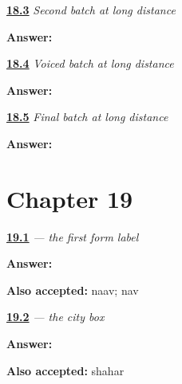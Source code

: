 \noindent\begin{minipage}[t]{\linewidth}
\raggedright
\hyperlink{review-MR-R18-script-b-r4-check}{\textbf{18.3}} \emph{Second batch at long distance}\par
\small \textbf{Answer:}   \par
\end{minipage}\par\medskip

\noindent\begin{minipage}[t]{\linewidth}
\raggedright
\hyperlink{review-MR-R18-script-c-r4-check}{\textbf{18.4}} \emph{Voiced batch at long distance}\par
\small \textbf{Answer:}   \par
\end{minipage}\par\medskip

\noindent\begin{minipage}[t]{\linewidth}
\raggedright
\hyperlink{review-MR-R18-script-d-r4-check}{\textbf{18.5}} \emph{Final batch at long distance}\par
\small \textbf{Answer:}   \par
\end{minipage}\par\medskip

\section*{Chapter 19}

\noindent\begin{minipage}[t]{\linewidth}
\raggedright
\hyperlink{review-MR-A1F01-naav-check}{\textbf{19.1}} \emph{ — the first form label}\par
\small \textbf{Answer:} \par
\footnotesize \textbf{Also accepted:} naav; nav
\end{minipage}\par\medskip

\noindent\begin{minipage}[t]{\linewidth}
\raggedright
\hyperlink{review-MR-A1F01-shahar-check}{\textbf{19.2}} \emph{ — the city box}\par
\small \textbf{Answer:} \par
\footnotesize \textbf{Also accepted:} shahar
\end{minipage}\par\medskip

